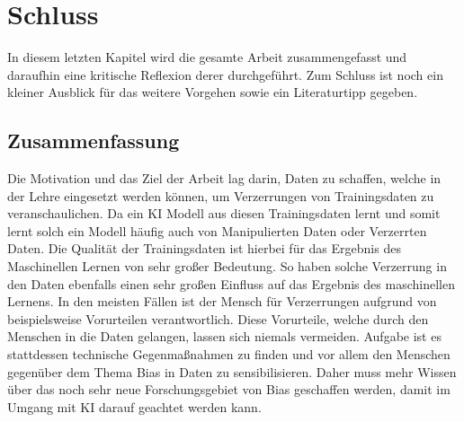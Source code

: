 \chapter{Schluss}
\label{sec:schluss}
\begin{onehalfspace}
    In diesem letzten Kapitel wird die gesamte Arbeit zusammengefasst und daraufhin eine kritische Reflexion derer durchgeführt. Zum Schluss ist noch ein kleiner Ausblick für das weitere Vorgehen sowie ein Literaturtipp gegeben.
\section{Zusammenfassung}
\label{zusammenfassung}
Die Motivation und das Ziel der Arbeit lag darin, Daten zu schaffen, welche in der Lehre eingesetzt werden können, um Verzerrungen von Trainingsdaten zu veranschaulichen. Da ein \ac{KI} Modell aus diesen Trainingsdaten lernt und somit lernt solch ein Modell häufig auch von Manipulierten Daten oder Verzerrten Daten. Die Qualität der Trainingsdaten ist hierbei für das Ergebnis des Maschinellen Lernen von sehr großer Bedeutung. So haben solche Verzerrung in den Daten ebenfalls einen sehr großen Einfluss auf das Ergebnis des maschinellen Lernens. In den meisten Fällen ist der Mensch für Verzerrungen aufgrund von beispielsweise Vorurteilen verantwortlich. Diese Vorurteile, welche durch den Menschen in die Daten gelangen, lassen sich niemals vermeiden. Aufgabe ist es stattdessen technische Gegenmaßnahmen zu finden und vor allem den Menschen gegenüber dem Thema Bias in Daten zu sensibilisieren. Daher muss mehr Wissen über das noch sehr neue Forschungsgebiet von Bias geschaffen werden, damit im Umgang mit KI darauf geachtet werden kann.\\

\end{onehalfspace}
